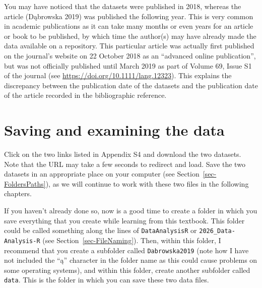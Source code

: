 \documentclass[
  letterpaper,
  DIV=11,
  numbers=noendperiod]{scrreprt}
\begin{document}
You may have noticed that the datasets were published in 2018, whereas
the article (Dąbrowska 2019) was published the following year. This is
very common in academic publications as it can take many months or even
years for an article or book to be published, by which time the
author(s) may have already made the data available on a repository. This
particular article was actually first published on the journal's website
on 22 October 2018 as an ``advanced online publication'', but was not
officially published until March 2019 as part of Volume 69, Issue S1 of
the journal (see \url{https://doi.org/10.1111/lang.12323}). This
explains the discrepancy between the publication date of the datasets
and the publication date of the article recorded in the bibliographic
reference.

\section{Saving and examining the data}\label{sec-SavingData}

Click on the two links listed in Appendix S4 and download the two
datasets. Note that the URL may take a few seconds to redirect and load.
Save the two datasets in an appropriate place on your computer (see
Section~\ref{sec-FoldersPaths}), as we will continue to work with these
two files in the following chapters.

\begin{tcolorbox}[enhanced jigsaw, arc=.35mm, bottomrule=.15mm, bottomtitle=1mm, breakable, colback=white, colbacktitle=quarto-callout-note-color!10!white, colframe=quarto-callout-note-color-frame, coltitle=black, left=2mm, leftrule=.75mm, opacityback=0, opacitybacktitle=0.6, rightrule=.15mm, title=\textcolor{quarto-callout-note-color}{\faInfo}\hspace{0.5em}{What's a good place to save these files?~\emoji{thinking}}, titlerule=0mm, toprule=.15mm, toptitle=1mm]

If you haven't already done so, now is a good time to create a folder in
which you save everything that you create while learning from this
textbook. This folder could be called something along the lines of
\texttt{DataAnalysisR} or \texttt{2026\_Data-Analysis-R} (see
Section~\ref{sec-FileNaming}). Then, within this folder, I recommend
that you create a subfolder called \texttt{Dabrowska2019} (note how I
have not included the ``ą'' character in the folder name as this could
cause problems on some operating systems), and within this folder,
create another subfolder called \texttt{data}. This is the folder in
which you can save these two data files.

\end{tcolorbox}
\end{document}
